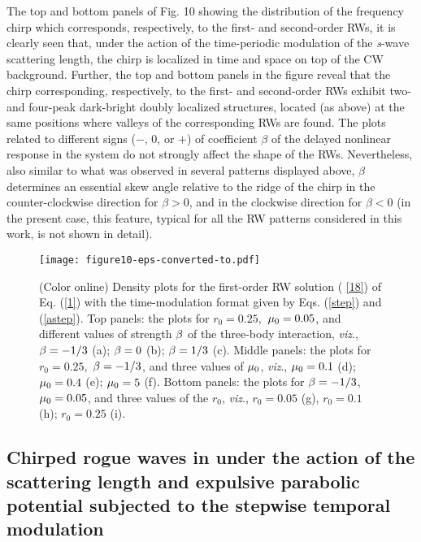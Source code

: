 \documentclass[preprintnumbers]{revtex4}
\begin{document}
The top and bottom panels of Fig. 10 showing the distribution of the
frequency chirp which corresponds, respectively, to the first- and
second-order RWs, it is clearly seen that, under the action of the
time-periodic modulation of the \textit{s}-wave scattering length, the chirp
is localized in time and space on top of the CW background. Further, the top
and bottom panels in the figure reveal that the chirp corresponding,
respectively, to the first- and second-order RWs exhibit two- and four-peak
dark-bright doubly localized structures, located (as above) at the same
positions where valleys of the corresponding RWs are found. The plots
related to different signs ($-$, $0$, or $+$) of coefficient $\beta $ of the
delayed nonlinear response in the system do not strongly affect the shape of
the RWs. Nevertheless, also similar to what was observed in several patterns
displayed above, $\beta $ determines an essential skew angle relative to the
ridge of the chirp in the counter-clockwise direction for $\beta >0$, and in
the clockwise direction for $\beta <0$ (in the present case, this feature,
typical for all the RW patterns considered in this work, is not shown in
detail).

\begin{figure}[tbp]
\centerline{\texttt{[image: figure10-eps-converted-to.pdf]}}
\caption{(Color online) Density plots for the first-order RW solution (%
\protect\ref{18}) of Eq. (\protect\ref{1}) with the time-modulation format
given by Eqs. (\protect\ref{step}) and (\protect\ref{astep}). Top panels:
the plots for $r_{0}=0.25,$ $\protect\mu _{0}=0.05$, and different values of
strength $\protect\beta $ of the three-body interaction, \textit{viz}., $%
\protect\beta =-1/3$ (a); $\protect\beta =0$ (b); $\protect\beta =1/3$ (c).
Middle panels: the plots for $r_{0}=0.25,$ $\protect\beta =-1/3$, and three
values of $\protect\mu _{0}$, \textit{viz}., $\protect\mu _{0}=0.1$ (d); $%
\protect\mu _{0}=0.4$ (e); $\protect\mu _{0}=5$ (f). Bottom panels: the
plots for $\protect\beta =-1/3$, $\protect\mu _{0}=0.05$, and three values
of the $r_{0}$, \textit{viz}., $r_{0}=0.05$ (g), $r_{0}=0.1$ (h); $%
r_{0}=0.25 $ (i).}
\label{fig11}
\end{figure}

\subsection{Chirped rogue waves in under the action of the scattering length
and expulsive parabolic potential subjected to the stepwise temporal
modulation}
\end{document}
